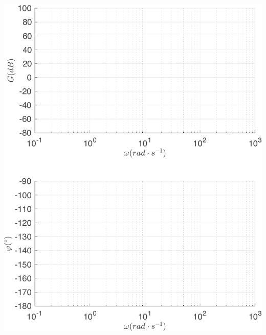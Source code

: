 \documentclass[10pt,fleqn]{article} %
\begin{document}
\begin{multicols}{2}
\begin{center}
\includegraphics[width=1.0\linewidth]{images/matlab/bode_total0_pi.pdf}
\end{center}
%


\end{multicols}
\end{document}
